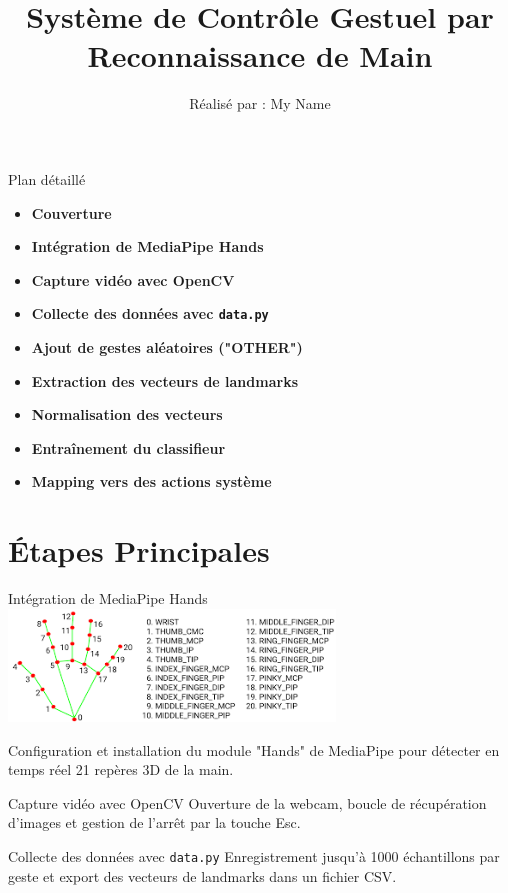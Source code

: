 \documentclass{beamer}
\title[Contrôle Gestuel]{Système de Contrôle Gestuel par Reconnaissance de Main}
\author{Réalisé par : My Name}
\date{}
\begin{document}
\begin{frame}{Plan détaillé}
\begin{itemize}
  \item \textbf{Couverture}\hfill

  \item \textbf{Intégration de MediaPipe Hands}\hfill
  \item \textbf{Capture vidéo avec OpenCV}\hfill
  \item \textbf{Collecte des données avec \texttt{data.py}}\hfill
  \item \textbf{Ajout de gestes aléatoires ("OTHER")}\hfill
  \item \textbf{Extraction des vecteurs de landmarks}\hfill
  \item \textbf{Normalisation des vecteurs}\hfill
  \item \textbf{Entraînement du classifieur}\hfill
  \item \textbf{Mapping vers des actions système}\hfill
\end{itemize}
\end{frame}

\section{Étapes Principales}

\begin{frame}{Intégration de MediaPipe Hands}
    \includegraphics[height=3cm]{hand.png}

Configuration et installation du module "Hands" de MediaPipe pour détecter en temps réel 21 repères 3D de la main.
\end{frame}

\begin{frame}{Capture vidéo avec OpenCV}
Ouverture de la webcam, boucle de récupération d'images et gestion de l'arrêt par la touche Esc.
\end{frame}

\begin{frame}{Collecte des données avec \texttt{data.py}}
Enregistrement jusqu'à 1000 échantillons par geste et export des vecteurs de landmarks dans un fichier CSV.
\end{frame}
\end{document}
